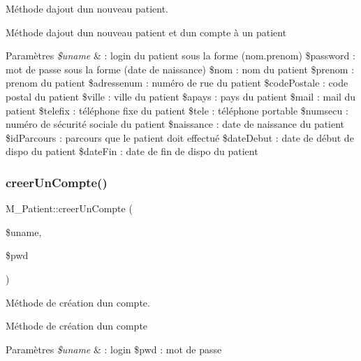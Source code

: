 Méthode d\textquotesingle{}ajout d\textquotesingle{}un nouveau patient. 

Méthode d\textquotesingle{}ajout d\textquotesingle{}un nouveau patient et d\textquotesingle{}un compte à un patient 
\begin{DoxyParams}{Paramètres}
{\em \$uname} & \+: login du patient sous la forme (nom.\+prenom) \$password \+: mot de passe sous la forme (date de naissance) \$nom \+: nom du patient \$prenom \+: prenom du patient \$adressenum \+: numéro de rue du patient \$code\+Postale \+: code postal du patient \$ville \+: ville du patient \$apays \+: pays du patient \$mail \+: mail du patient \$telefix \+: téléphone fixe du patient \$tele \+: téléphone portable \$numsecu \+: numéro de sécurité sociale du patient \$naissance \+: date de naissance du patient \$id\+Parcours \+: parcours que le patient doit effectué \$date\+Debut \+: date de début de dispo du patient \$date\+Fin \+: date de fin de dispo du patient \\
\hline
\end{DoxyParams}
\mbox{\label{class_m___patient_a2b41b0d0ce073bf55991a632e0206b3e}} 
\subsubsection{\texorpdfstring{creer\+Un\+Compte()}{creerUnCompte()}}
{\footnotesize\ttfamily M\+\_\+\+Patient\+::creer\+Un\+Compte (\begin{DoxyParamCaption}\item[{}]{\$uname,  }\item[{}]{\$pwd }\end{DoxyParamCaption})}



Méthode de création d\textquotesingle{}un compte. 

Méthode de création d\textquotesingle{}un compte 
\begin{DoxyParams}{Paramètres}
{\em \$uname} & \+: login \$pwd \+: mot de passe \\
\hline
\end{DoxyParams}
\mbox{\label{class_m___patient_a7c2dbb60dd76caa57488fc721758a2fe}} 
